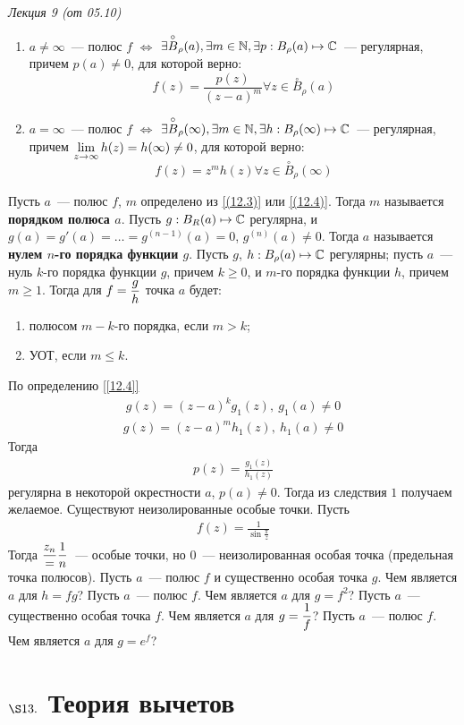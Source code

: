 \begin{flushright}
    \textit{Лекция 9 (от 05.10)}
\end{flushright}
\corollary
\begin{enumerate}
    \item $a \neq \infty$~--- полюс $f$ $\Leftrightarrow$ $\exists
    \overset{\circ}{B}_{\rho}(a), \exists m \in \mathbb{N}, \exists p: B_{\rho}(a)
    \mapsto \mathbb{C}$~--- регулярная, причем $p(a) \neq 0$, для которой верно:
    \begin{equation}\label{(12.3)}
        f(z) = \frac{p(z)}{(z-a)^m} \forall z \in \overset{\circ}{B}_\rho(a)
    \end{equation}
    \item $a = \infty$~--- полюс $f$ $\Leftrightarrow$ $\exists
    \overset{\circ}{B}_{\rho}(\infty), \exists m \in \mathbb{N}, \exists h:
    B_{\rho}(\infty) \mapsto \mathbb{C}$~--- регулярная, причем $\displaystyle\lim_{z \to
      \infty} h(z) = h(\infty) \neq 0$, для которой верно:
    \begin{equation}\label{(12.4)}
        f(z) = z^mh(z) \forall z \in \overset{\circ}{B}_\rho(\infty)
    \end{equation}
\end{enumerate}
\Def \label{[12.3]}
Пусть $a$~--- полюс $f$, $m$ определено из \eqref{(12.3)} или
\eqref{(12.4)}. Тогда $m$ называется \textbf{порядком полюса $a$}.
\Def \label{[12.4]}
Пусть $g: B_R(a) \mapsto \mathbb{C}$ регулярна, и $g(a) = g'(a) = \dots = g^{(n-1)}(a)
= 0$, $g^{(n)}(a)\neq 0$. Тогда $a$ называется \textbf{нулем $n$-го порядка
  функции $g$}.
\corollary
Пусть $g$, $h: B_\rho(a) \mapsto \mathbb{C}$ регулярны; пусть $a$~--- нуль $k$-го
порядка функции $g$, причем $k \geq 0$, и $m$-го порядка функции $h$, причем $m
\geq 1$. Тогда для $f = \displaystyle \frac{g}{h}$ точка $a$ будет:
\begin{enumerate}
    \item полюсом $m-k$-го порядка, если $m > k$;
    \item УОТ, если $m \leq k$.
\end{enumerate}
\pr
По определению \ref{[12.4]}
\begin{align*}
  g(z) = (z-a)^kg_1(z), \ g_1(a) \neq 0
\end{align*}
\begin{align*}
  g(z) = (z-a)^mh_1(z), \ h_1(a) \neq 0
\end{align*}
Тогда
\begin{align*}
  p(z) = \frac{g_1(z)}{h_1(z)}
\end{align*}
регулярна в некоторой окрестности $a$, $p(a) \neq 0$. Тогда из следствия $1$
получаем желаемое.
\note
Существуют неизолированные особые точки. Пусть
\begin{align*}
  f(z) = \frac{1}{\sin \frac{\pi}{z}}
\end{align*}
Тогда $\displaystyle \frac{z_n} = \frac{1}{n}$~--- особые точки, но $0$~---
неизолированная особая точка (предельная точка полюсов).
\Exse
Пусть $a$~--- полюс $f$ и существенно особая точка $g$. Чем является $a$ для $h
= fg$?
\Exse
Пусть $a$~--- полюс $f$. Чем является $a$ для $g= f^2$?
\Exse
Пусть $a$~--- существенно особая точка $f$. Чем является $a$ для $g = \displaystyle
\frac{1}{f}$?
\Exse
Пусть $a$~--- полюс $f$. Чем является $a$ для $g = e^f$?
\section{$\S 13.$ Теория вычетов}
